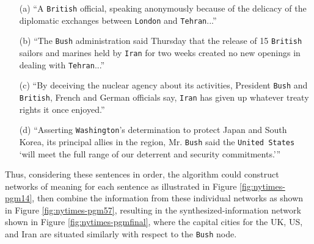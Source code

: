 \documentclass[11pt]{article}
\newcommand{\entity}[1]{\texttt{#1}}
\begin{document}
\begin{enumerate}
	\item[(a)] ``A \entity{British} official, speaking anonymously because of the delicacy of the diplomatic exchanges between \entity{London} and \entity{Tehran}...''
	\item[(b)] ``The \entity{Bush} administration said Thursday that the release of 15 \entity{British} sailors and marines held by \entity{Iran} for two weeks created no new openings in dealing with \entity{Tehran}...''
	\item[(c)] ``By deceiving the nuclear agency about its activities, President \entity{Bush} and \entity{British}, French and German officials say, \entity{Iran} has given up whatever treaty rights it once enjoyed.''
	\item[(d)] ``Asserting \entity{Washington}'s determination to protect Japan and South Korea, its principal allies in the region, Mr. \entity{Bush} said the \entity{United States} `will meet the full range of our deterrent and security commitments.'{}''
\end{enumerate}
Thus, considering these sentences in order, the algorithm could construct networks of meaning for each sentence as illustrated in Figure \ref{fig:nytimes-pgm14}, then combine the information from these individual networks as shown in Figure \ref{fig:nytimes-pgm57}, resulting in the synthesized-information network shown in Figure \ref{fig:nytimes-pgmfinal}, where the capital cities for the UK, US, and Iran are situated similarly with respect to the \entity{Bush} node.
\end{document}
